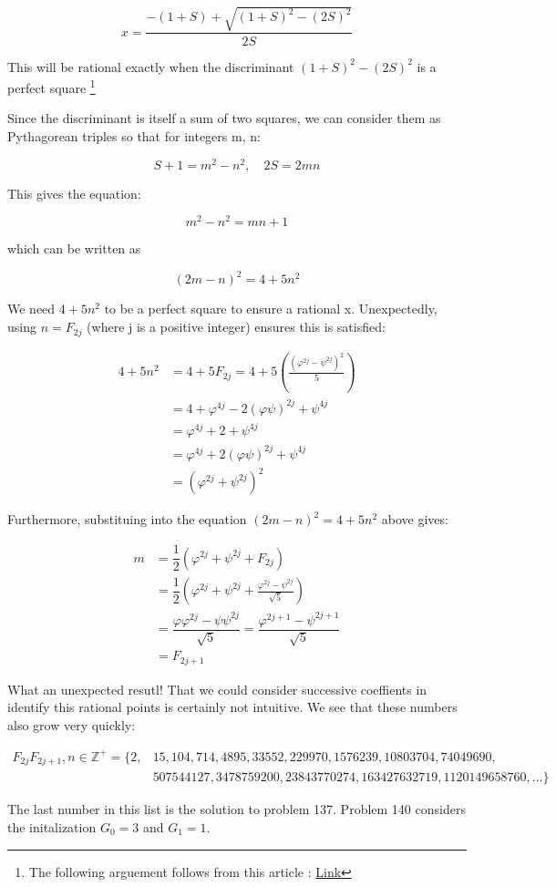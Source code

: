 \documentclass[12pt]{article}
\begin{document}
$$
x = \dfrac{-(1 + S) + \sqrt{(1 + S)^2 - (2S)^2}}{2S}
$$

This will be rational exactly when the discriminant $(1 + S)^2 - (2S)^2$ is a perfect square \footnote{The following arguement follows from this article : \href{https://github.com/chenson2018/Project-Euler-Solutions/blob/master/Haskell\%20Solutions/137_and_140/Reference.pdf/}{Link}} 

\newpage

Since the discriminant is itself a sum of two squares, we can consider them as Pythagorean triples so that for integers m, n:

$$
S + 1 = m^2 - n^2,\quad 2S = 2mn
$$

This gives the equation:

$$
m^2 - n^2 = mn + 1
$$

which can be written as

$$
(2m-n)^2 = 4 + 5n^2
$$

We need $4 + 5n^2$ to be a perfect square to ensure a rational x. Unexpectedly, using $n = F_{2j}$ (where j is a positive integer) ensures this is satisfied:

\begin{align*}
4 + 5n^2 &= 4 + 5F_{2j} = 4 + 5 \left( \frac{(\varphi^{2j}-\psi^{2j})^2}{5} \right)\\
                &= 4 + \varphi^{4j} - 2(\varphi\psi)^{2j} + \psi^{4j}\\
                &= \varphi^{4j} + 2 + \psi^{4j}\\
	     &=   \varphi^{4j} + 2 (\varphi\psi)^{2j}+ \psi^{4j}\\
	     &= (\varphi^{2j} + \psi^{2j})^2
\end{align*}



Furthermore, substituing into the equation $(2m-n)^2 = 4 + 5n^2$  above gives:

\begin{align*}
m &= \dfrac{1}{2} (\varphi^{2j} + \psi^{2j} + F_{2j})\\
    &= \dfrac{1}{2} \left( \varphi^{2j} + \psi^{2j} + \frac{\varphi^{2j}-\psi^{2j}}{\sqrt{5}} \right)\\
    &= \dfrac{\varphi\varphi^{2j} - \psi\psi^{2j}}{\sqrt5} = \dfrac{\varphi^{2j+1} - \psi^{2j+1}}{\sqrt5}\\
    &= F_{2j+1}
\end{align*}

\newpage

What an unexpected resutl! That we could consider successive coeffients in identify this rational points is certainly not intuitive. We see that these numbers also grow very quickly:

\begin{align*}
F_{2j}F_{2j+1}, n \in \mathbb{Z}^+= \{2, &15, 104, 714, 4895, 33552, 229970, 1576239, 10803704, 74049690,\\
					          &  507544127, 3478759200, 23843770274, 163427632719, 1120149658760, \dots\}
\end{align*}


The last number in this list is the solution to problem 137. Problem 140 considers the initalization $G_0 = 3$ and $G_1 = 1$.
\end{document}
